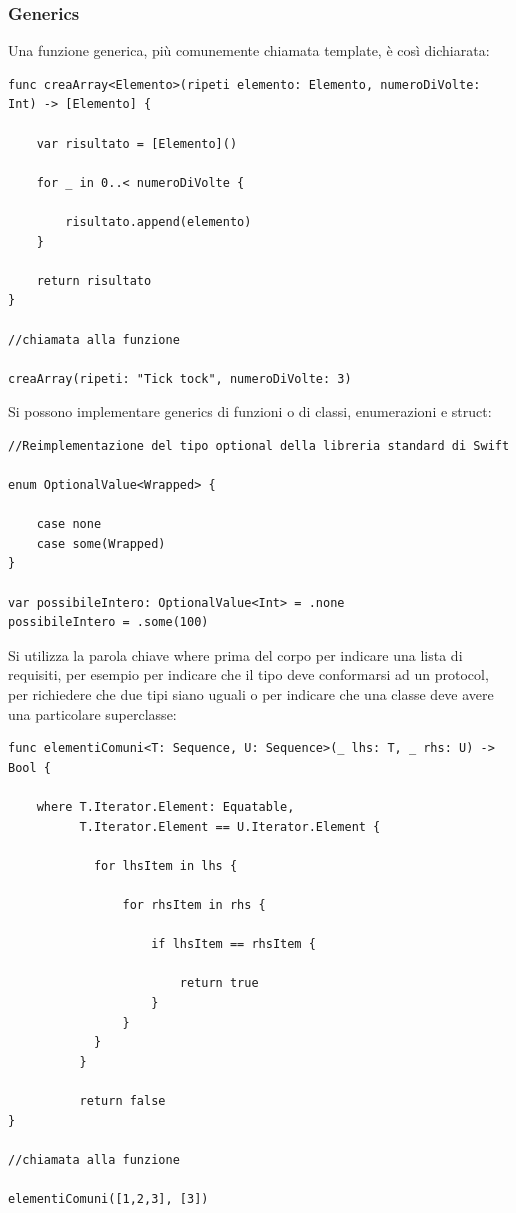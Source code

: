 \subsubsection{Generics}
Una funzione generica, più comunemente chiamata template, è così dichiarata:
\lstset{language=[Objective]C, breakindent=40pt, breaklines} 
\begin{lstlisting}
func creaArray<Elemento>(ripeti	elemento: Elemento, numeroDiVolte: Int) -> [Elemento] {

	var risultato = [Elemento]()
	
	for _ in 0..< numeroDiVolte {
		
		risultato.append(elemento)
	}
	
	return risultato
}

//chiamata alla funzione 

creaArray(ripeti: "Tick tock", numeroDiVolte: 3)
\end{lstlisting}
Si possono implementare generics di funzioni o di classi, enumerazioni e struct:
\lstset{language=[Objective]C, breakindent=40pt, breaklines}
\begin{lstlisting}
//Reimplementazione del tipo optional della libreria standard di Swift

enum OptionalValue<Wrapped> {

	case none 
	case some(Wrapped)
}

var possibileIntero: OptionalValue<Int> = .none
possibileIntero = .some(100)
\end{lstlisting}
Si utilizza la parola chiave where prima del corpo per indicare una lista di requisiti, per esempio per indicare che il tipo deve conformarsi ad un protocol, per richiedere che due tipi siano uguali o per indicare che una classe deve avere una particolare superclasse: 
\lstset{language=[Objective]C, breakindent=40pt, breaklines}
\begin{lstlisting}
func elementiComuni<T: Sequence, U: Sequence>(_ lhs: T, _ rhs: U) -> Bool {
	
	where T.Iterator.Element: Equatable,
		  T.Iterator.Element == U.Iterator.Element {
		  
		  	for lhsItem in lhs {
		  	
		  		for rhsItem in rhs {
		  		
		  			if lhsItem == rhsItem {
		  				
		  				return true
		  			}
		  		}
		  	}
		  }
		  
		  return false
}

//chiamata alla funzione 

elementiComuni([1,2,3], [3])
\end{lstlisting}
